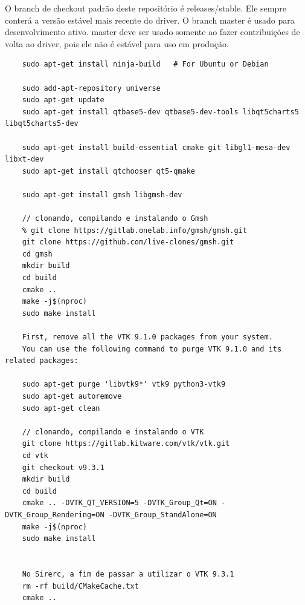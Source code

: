 \documentclass[a4paper,11pt]{article}
\begin{document}
O branch de checkout padrão deste repositório é releases/stable. Ele sempre conterá a versão estável mais recente do driver. O branch master é usado para desenvolvimento ativo. master deve ser usado somente ao fazer contribuições de volta ao driver, pois ele não é estável para uso em produção.

\begin{verbatim}
	sudo apt-get install ninja-build   # For Ubuntu or Debian
	
	sudo add-apt-repository universe
	sudo apt-get update
	sudo apt-get install qtbase5-dev qtbase5-dev-tools libqt5charts5 libqt5charts5-dev
	
	sudo apt-get install build-essential cmake git libgl1-mesa-dev libxt-dev
	sudo apt-get install qtchooser qt5-qmake
	
	sudo apt-get install gmsh libgmsh-dev
	
	// clonando, compilando e instalando o Gmsh
	% git clone https://gitlab.onelab.info/gmsh/gmsh.git
	git clone https://github.com/live-clones/gmsh.git
	cd gmsh
	mkdir build
	cd build
	cmake ..
	make -j$(nproc)
	sudo make install
	
	First, remove all the VTK 9.1.0 packages from your system.
	You can use the following command to purge VTK 9.1.0 and its related packages:
	
	sudo apt-get purge 'libvtk9*' vtk9 python3-vtk9
	sudo apt-get autoremove
	sudo apt-get clean
	
	// clonando, compilando e instalando o VTK
	git clone https://gitlab.kitware.com/vtk/vtk.git
	cd vtk
	git checkout v9.3.1
	mkdir build
	cd build
	cmake .. -DVTK_QT_VERSION=5 -DVTK_Group_Qt=ON -DVTK_Group_Rendering=ON -DVTK_Group_StandAlone=ON
	make -j$(nproc)
	sudo make install
	
	
	No Sirerc, a fim de passar a utilizar o VTK 9.3.1
	rm -rf build/CMakeCache.txt
	cmake ..
	
\end{verbatim}
\end{document}
